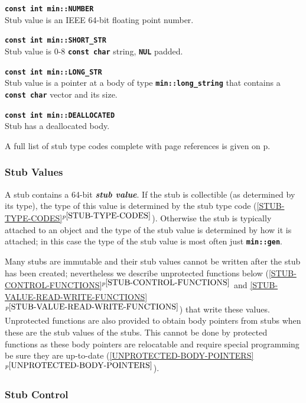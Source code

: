 \documentclass[12pt]{article}
\newcommand{\TT}[1]{{\tt \bfseries #1}}
\newcommand{\key}[1]{{\bf \em #1}\index{#1}}
\newcommand{\itemref}[1]{\ref{#1}$^{p\pageref{#1}}$}
\newcommand{\pagref}[1]{p\pageref{#1}}
\newcommand{\EOL}{\penalty \exhyphenpenalty}
\newenvironment{indpar}[1][0.3in]%
	{\begin{list}{}%
		     {\setlength{\itemsep}{0in}%
		      \setlength{\topsep}{0in}%
		      \setlength{\parsep}{1ex}%
		      \setlength{\labelwidth}{#1}%
		      \setlength{\leftmargin}{#1}%
		      \addtolength{\leftmargin}{\labelsep}}%
	 \item}%
	{\end{list}}
\begin{document}
\begin{indpar}
\begin{list}{}{}
\item[\TT{const int min::NUMBER}]~\\
Stub value is an IEEE 64-bit floating point number.
\item[\TT{const int min::SHORT\_STR}]~\\
Stub value is 0-8 \TT{const char} string, \TT{NUL} padded.
\item[\TT{const int min::LONG\_STR}]~\\
Stub value is a pointer at a body of type \TT{min::long\_\EOL string}
that contains a \TT{const char} vector and its size. 
\item[\TT{const int min::DEALLOCATED}]~\\
Stub has a deallocated body.
\end{list}
\end{indpar}

A full list of stub type codes complete with page references
is given on \pagref{STUB-TYPE-CODE-LIST}.

\subsubsection{Stub Values}
\label{STUB-VALUES}

A stub contains a 64-bit \key{stub value}.  If the stub is collectible
(as determined by its type), the type of this value
is determined by the stub type code (\itemref{STUB-TYPE-CODES}).
Otherwise the stub is typically attached to an object and the type of the stub
value is determined by how it is attached; in this case the type of the
stub value is most often just \TT{min::gen}.

Many stubs are immutable
and their stub values cannot be written after the stub has been created;
nevertheless we describe unprotected functions
below (\itemref{STUB-CONTROL-FUNCTIONS} and
\itemref{STUB-VALUE-READ-WRITE-FUNCTIONS}) that
write these values.  Unprotected functions are also provided to obtain
body pointers from stubs when these are the stub values of the stubs.
This cannot be done by protected
functions as these body pointers are relocatable and require special
programming be sure they are up-to-date (\itemref{UNPROTECTED-BODY-POINTERS}).

\subsubsection{Stub Control}
\label{STUB-CONTROL}
\end{document}
